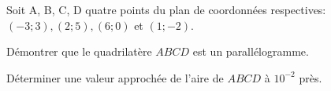 \documentclass[11pt,a4paper]{article}  %
\newcommand{\axeOI}[3][0]{\draw[axe] (#2,#1)--(#3,#1);  \draw (1,#1) node {\small $+$}; \draw (1,#1) node[below] {\small $I$};}
\newcommand{\axeOJ}[3][0]{\draw[axe] (#1,#2)--(#1,#3); \draw (#1, 1) node {\small $+$}; \draw (#1, 1) node[left] {\small $J$};}
\newcommand{\origineO}{\draw (0,0) node[below left] {$O$};}
\newcommand{\point}[4]{\draw (#1,#2) node[#4] {$#3$};}
\begin{document}
Soit A, B, C, D quatre points du plan de coordonnées respectives: $(-3 ; 3),(2 ; 5),(6 ; 0)$ et $(1 ;-2)$.
\begin{enumMet}
	\item Démontrer que le quadrilatère $A B C D$ est un parallélogramme.
%		
	\item Déterminer une valeur approchée de l'aire de $A B C D$ à $10^{-2}$ près.
%		
%		

\end{enumMet}
\end{document}
